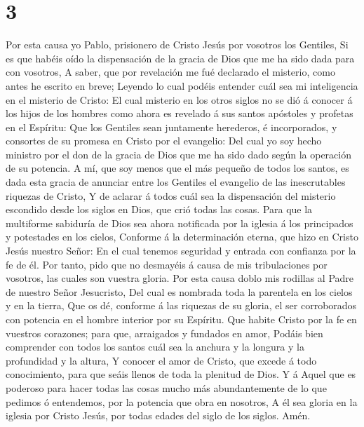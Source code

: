 \hypertarget{section-2}{%
\section{3}\label{section-2}}

 Por esta causa yo Pablo, prisionero de Cristo Jesús por
vosotros los Gentiles,  Si es que habéis oído la
dispensación de la gracia de Dios que me ha sido dada para con vosotros,
 A saber, que por revelación me fué declarado el misterio,
como antes he escrito en breve;  Leyendo lo cual podéis
entender cuál sea mi inteligencia en el misterio de Cristo: 
El cual misterio en los otros siglos no se dió á conocer á los hijos de
los hombres como ahora es revelado á sus santos apóstoles y profetas en
el Espíritu:  Que los Gentiles sean juntamente herederos, é
incorporados, y consortes de su promesa en Cristo por el evangelio:
 Del cual yo soy hecho ministro por el don de la gracia de
Dios que me ha sido dado según la operación de su potencia. 
A mí, que soy menos que el más pequeño de todos los santos, es dada esta
gracia de anunciar entre los Gentiles el evangelio de las inescrutables
riquezas de Cristo,  Y de aclarar á todos cuál sea la
dispensación del misterio escondido desde los siglos en Dios, que crió
todas las cosas.  Para que la multiforme sabiduría de Dios
sea ahora notificada por la iglesia á los principados y potestades en
los cielos,  Conforme á la determinación eterna, que hizo
en Cristo Jesús nuestro Señor:  En el cual tenemos
seguridad y entrada con confianza por la fe de él.  Por
tanto, pido que no desmayéis á causa de mis tribulaciones por vosotros,
las cuales son vuestra gloria.  Por esta causa doblo mis
rodillas al Padre de nuestro Señor Jesucristo,  Del cual es
nombrada toda la parentela en los cielos y en la tierra, 
Que os dé, conforme á las riquezas de su gloria, el ser corroborados con
potencia en el hombre interior por su Espíritu.  Que habite
Cristo por la fe en vuestros corazones; para que, arraigados y fundados
en amor,  Podáis bien comprender con todos los santos cuál
sea la anchura y la longura y la profundidad y la altura, 
Y conocer el amor de Cristo, que excede á todo conocimiento, para que
seáis llenos de toda la plenitud de Dios.  Y á Aquel que es
poderoso para hacer todas las cosas mucho más abundantemente de lo que
pedimos ó entendemos, por la potencia que obra en nosotros,
 A él sea gloria en la iglesia por Cristo Jesús, por todas
edades del siglo de los siglos. Amén.

